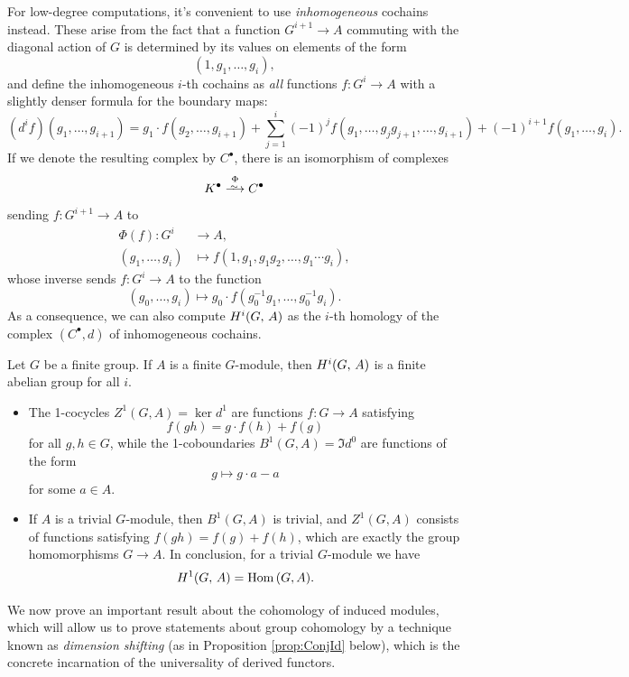 \documentclass[a4paper, oneside]{memoir}
\begin{document}
For low-degree computations, it's convenient to use \textit{inhomogeneous} cochains instead. These arise from the fact that a function $G^{i+1}\to A$ commuting with the diagonal action of $G$ is determined by its values on elements of the form \[(1,g_1,\dots , g_i),\] and define the inhomogeneous $i$-th cochains as \textit{all} functions $f: G^i\to A$ with a slightly denser formula for the boundary maps:
\[
    (d^i f)(g_1,\dots , g_{i+1})=g_1\cdot f(g_2,\dots , g_{i+1})+\sum_{j=1}^{i} (-1)^j f(g_1,\dots , g_j g_{j+1},\dots , g_{i+1})+(-1)^{i+1} f(g_1,\dots , g_i).
\]
If we denote the resulting complex by $C^\bullet$, there is an isomorphism of complexes
\[
    K^\bullet\overset{\Phi}{\Iso} C^\bullet
\]
sending $f: G^{i+1}\to A$ to
\begin{align*}
    \Phi(f): G^i      & \to A,                                            \\
    (g_1,\dots , g_i) & \mapsto f(1,g_1, g_1 g_2, \dots , g_1\cdots g_i),
\end{align*}
whose inverse sends $f: G^i\to A$ to the function
\[
    (g_0,\dots , g_i)\mapsto g_0\cdot f(g_0^{-1}g_1,\dots , g_0^{-1}g_i).
\]
As a consequence, we can also compute $H^{i}( G, \, A )$ as the $i$-th homology of the complex $(C^\bullet, d)$ of inhomogeneous cochains.

\begin{corollary}
    Let $G$ be a finite group. If $A$ is a finite $G$-module, then $H^{i}( G, \, A )$ is a finite abelian group for all $i$.
\end{corollary}
\begin{example}
    \noindent
    \begin{itemize}
        \item The 1-cocycles $Z^1(G,A)=\ker{d^1}$ are functions $f: G\to A$ satisfying $$f(gh)=g\cdot f(h)+f(g)$$ for all $g,h\in G$, while the 1-coboundaries $B^1(G,A)=\Im{d^0}$ are functions of the form $$g\mapsto g\cdot a-a$$ for some $a\in A$.
        \item\label{ex:TrivialModH1} If $A$ is a trivial $G$-module, then $B^1(G,A)$ is trivial, and $Z^1(G,A)$ consists of functions satisfying $f(gh)=f(g)+f(h)$, which are exactly the group homomorphisms $G\to A$. In conclusion, for a trivial $G$-module we have \[H^{1}( G, \, A )=\operatorname{Hom}{(G,A)}.\]
    \end{itemize}
\end{example}

We now prove an important result about the cohomology of induced modules, which will allow us to prove statements about group cohomology by a technique known as \textit{dimension
    shifting} (as in Proposition \ref{prop:ConjId} below), which is the concrete incarnation of the universality of derived functors.
\end{document}
